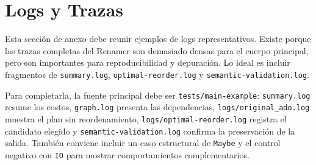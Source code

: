 
\section{Logs y Trazas}

Esta sección de anexo debe reunir ejemplos de logs representativos. Existe porque las trazas completas del Renamer son demasiado densas para el cuerpo principal, pero son importantes para reproducibilidad y depuración. Lo ideal es incluir fragmentos de \texttt{summary.log}, \texttt{optimal-reorder.log} y \texttt{semantic-validation.log}.

Para completarla, la fuente principal debe ser \texttt{tests/main-example}: \texttt{summary.log} resume los costos, \texttt{graph.log} presenta las dependencias, \texttt{logs/original\_ado.log} muestra el plan sin reordenamiento, \texttt{logs/optimal-reorder.log} registra el candidato elegido y \texttt{semantic-validation.log} confirma la preservación de la salida. También conviene incluir un caso estructural de \texttt{Maybe} y el control negativo con \texttt{IO} para mostrar comportamientos complementarios.
